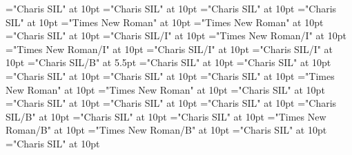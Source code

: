 \documentclass[a4paper,twoside]{article}
\begin{document}
\font\spanenetymologyentryletDatadicBody="Charis SIL" at 10pt
\font\etymologyformenetymologyentryletDatadicBody="Charis SIL" at 10pt
\font\spanenetymologyformenetymologyentryletDatadicBody="Charis SIL" at 10pt
\font\translationsexamplessensesensesentryletDatadicBody="Charis SIL" at 10pt
\font\translationpttranslationsexamplessensesensesentryletDatadicBody="Times New Roman" at 10pt
\font\spanpttranslationpttranslationsexamplessensesensesentryletDatadicBody="Times New Roman" at 10pt
\font\spanentranslationpttranslationsexamplessensesensesentryletDatadicBody="Charis SIL" at 10pt
\font\grammaticalinfosensesentryletDatadicBody="Charis SIL/I" at 10pt
\font\partofspeechptgrammaticalinfosensesentryletDatadicBody="Times New Roman/I" at 10pt
\font\spanptpartofspeechptgrammaticalinfosensesentryletDatadicBody="Times New Roman/I" at 10pt
\font\spanenpartofspeechptgrammaticalinfosensesentryletDatadicBody="Charis SIL/I" at 10pt
\font\spanengrammaticalinfosensesentryletDatadicBody="Charis SIL/I" at 10pt
\font\xhomographnumberheadwordsehentryletDatadicBody="Charis SIL/B" at 5.5pt
\font{}="Charis SIL" at 10pt
\font\spanendefinitionLcensensesensesentryletDatadicBody="Charis SIL" at 10pt
\font\primaryrefsentryletDatadicBody="Charis SIL" at 10pt
\font\spanenprimaryrefsentryletDatadicBody="Charis SIL" at 10pt
\font\entryreftypeprimaryrefsentryletDatadicBody="Charis SIL" at 10pt
\font\LexEntryTypepublishStemEntryTypeAbbreviationPubptentryreftypeprimaryrefsentryletDatadicBody="Times New Roman" at 10pt
\font\spanptLexEntryTypepublishStemEntryTypeAbbreviationPubptentryreftypeprimaryrefsentryletDatadicBody="Times New Roman" at 10pt
\font\spanenLexEntryTypepublishStemEntryTypeAbbreviationPubptentryreftypeprimaryrefsentryletDatadicBody="Charis SIL" at 10pt
\font\spanenentryreftypeprimaryrefsentryletDatadicBody="Charis SIL" at 10pt
\font\entryrefcomponentprimaryrefsentryletDatadicBody="Charis SIL" at 10pt
\font\aentryrefcomponentprimaryrefsentryletDatadicBody="Charis SIL" at 10pt
\font\LexEntrypublishStemComponentTargetHeadWordRefsehaentryrefcomponentprimaryrefsentryletDatadicBody="Charis SIL/B" at 10pt
\font\subsensessensesensesentryletDatadicBody="Charis SIL" at 10pt
\font\sensesubsensessensesensesentryletDatadicBody="Charis SIL" at 10pt
\font\xsensenumbersensesubsensessensesensesentryletDatadicBody="Times New Roman/B" at 10pt
\font\xsensenumberaftersensesubsensessensesensesentryletDatadicBody="Times New Roman/B" at 10pt
\font{}="Charis SIL" at 10pt
\font\spanendefinitionLcensensesubsensessensesensesentryletDatadicBody="Charis SIL" at 10pt
\end{document}
